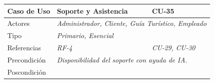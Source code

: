 \begin{table}[H]
    \begin{tabular}{|llllllll|}
    \hline
    \multicolumn{1}{|l|}{Caso de Uso}                    & \multicolumn{5}{l|}{Soporte y Asistencia}                                                                                                                                               & \multicolumn{2}{l|}{\cellcolor[HTML]{E6E6E6}CU-35}                                    \\ \hline
    \multicolumn{1}{|l|}{Actores}                        & \multicolumn{7}{l|}{{\color[HTML]{808080} \textit{Administrador, Cliente, Guía Turístico, Empleado}}}                                                                                                                                                                           \\ \hline
    \multicolumn{1}{|l|}{Tipo}                           & \multicolumn{7}{l|}{{\color[HTML]{808080} \textit{Primario, Esencial}}}                                                                                                                                                                                                         \\ \hline
    \multicolumn{1}{|l|}{Referencias}                    & \multicolumn{2}{l|}{{\color[HTML]{808080} \textit{RF-4}}}                                         & \multicolumn{5}{l|}{{\color[HTML]{808080} \textit{CU-29, CU-30}}}                                                                                                           \\ \hline
    \multicolumn{1}{|l|}{Precondición}                   & \multicolumn{7}{l|}{{\color[HTML]{808080} \textit{Disponibilidad del soporte con ayuda de IA.}}}                                                                                                                                                                                \\ \hline
    \multicolumn{1}{|l|}{Poscondición}                   & \multicolumn{7}{l|}{}                                                                                                                                                                                                                                                           \\ \hline

\end{tabular}
\end{table}
